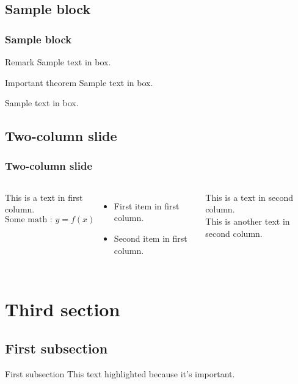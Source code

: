 \documentclass{beamer}
\begin{document}
\subsection{Sample block}
\begin{frame}
    \frametitle{Sample block}
    \begin{block}{Remark}
        Sample text in box.
    \end{block} 
        
    \begin{alertblock}{Important theorem}
        Sample text in box.
    \end{alertblock}
        
    \begin{examples}
        Sample text in box.
    \end{examples}
\end{frame}
    
\subsection{Two-column slide}
\begin{frame}
    \frametitle{Two-column slide}
    \begin{columns}
    This is a text in first column. \[\mbox{Some math : }y=f(x)\]
        \begin{itemize}
            \item First item in first column.
            \item Second item in first column.
        \end{itemize}
    
    This is a text in second column. \\
    This is another text in second column. 
    \end{columns}
\end{frame}




\section{Third section}
\subsection{First subsection}
\begin{frame}{First subsection}
    \alert{This text highlighted} because it's \colorbox{MyCyan3}{important.}
\end{frame}
\end{document}
